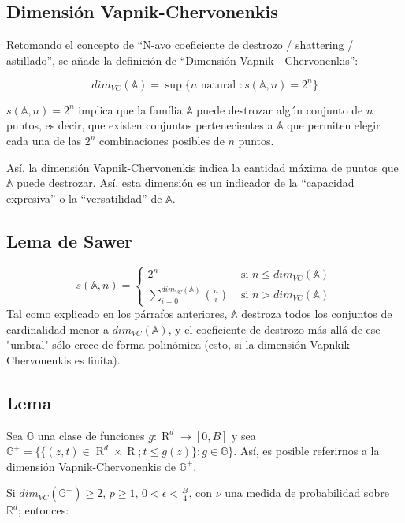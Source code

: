 \documentclass[12pt, a4paper]{article}
\begin{document}
\subsection{Dimensión Vapnik-Chervonenkis}
Retomando el concepto de ``N-avo coeficiente de destrozo / shattering / astillado'', se añade la definición de ``Dimensión Vapnik - Chervonenkis'':

$$dim_ {VC}(\mathds{A}) = \mathop{sup} \big \{ n \text{ natural }: s(\mathds{A},n)=2^n \big \}$$

$s(\mathds{A},n)=2^n$ implica que la família $\mathds{A}$ puede destrozar algún conjunto de $n$ puntos, es decir, que existen conjuntos pertenecientes a $\mathds{A}$ que permiten elegir cada una de las $2^n$ combinaciones posibles de $n$ puntos.

Así, la dimensión Vapnik-Chervonenkis indica la cantidad máxima de puntos que $\mathds{A}$ puede destrozar. Así, esta dimensión es un indicador de la ``capacidad expresiva'' o la ``versatilidad'' de $\mathds{A}$.

\subsection{Lema de Sawer}

$$
s(\mathds{A},n)=\begin{cases}
  2^n & \text{ si } n\leq dim_{VC}(\mathds{A}) \\
  \sum_{i=0}^{dim_{VC}(\mathds{A})} \binom{n}{i} & \text{ si } n > dim_{VC}(\mathds{A})
\end{cases}
$$
Tal como explicado en los párrafos anteriores, $\mathds{A}$ destroza todos los conjuntos de cardinalidad menor a $dim_{VC}(\mathds{A})$, y el coeficiente de destrozo más allá de ese "umbral" sólo crece de forma polinómica (esto, si la dimensión Vapnkik-Chervonenkis es finita).

\subsection{Lema}
Sea $\mathds{G}$ una clase de funciones $g:\mathop{R}^d \rightarrow [0,B]$ y sea $\mathds{G}^{+} = \big \{ \{ (z,t)\in \mathop{R}^d \times \mathop{R}; t\leq g(z) \}: g\in\mathds{G} \big \}$. Así, es posible referirnos a la dimensión Vapnik-Chervonenkis de $\mathds{G}^{+}$. 

Si $dim_{VC}(\mathds{G}^{+}) \geq 2$, $p\geq 1$, $0<\epsilon<\frac{B}{4}$, con $\nu$ una medida de probabilidad sobre $\mathds{R}^d$; entonces:
\end{document}
